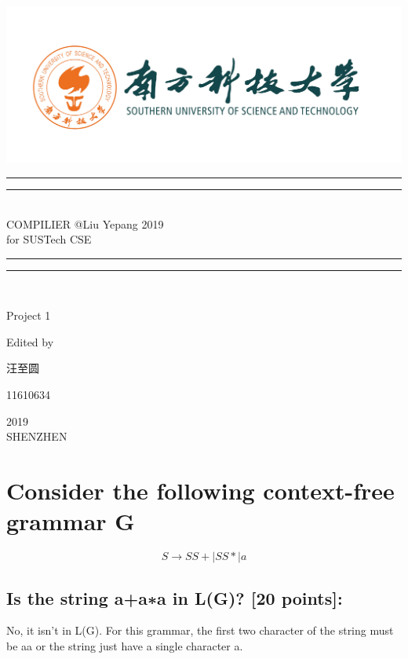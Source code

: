 \documentclass{article}
\begin{document}
 
    \begin{titlepage}       %
        \centering
        \includegraphics[width=\textwidth]{../SUSTC_LOGO.png}
        \rule{\textwidth}{1.6pt}\vspace*{-\baselineskip}\vspace*{2pt}
        \rule{\textwidth}{0.4pt}\\[\baselineskip]
        {\LARGE COMPILIER @Liu Yepang 2019\\[\baselineskip]\small for SUSTech CSE}
        \\[0.2\baselineskip]
        \rule{\textwidth}{0.4pt}\vspace*{-\baselineskip}\vspace{3.2pt}
        \rule{\textwidth}{1.6pt}\\[\baselineskip]
        \scshape
        \vspace*{\baselineskip}
        {\Large Project 1\par }
        Edited by \\[\baselineskip] {汪至圆\par}
        {\Large 11610634\par }
        \vfill
        {\scshape 2019} \\{\large SHENZHEN}\par
    \end{titlepage}
    \section{Consider the following context-free grammar G}
        $$S \rightarrow S S+|S S *| a$$
        \subsection{Is the string a+a∗a in L(G)? [20 points]:}
            No, it isn't in L(G). For this grammar, the first two character of the string
            must be aa or the string just have a single character a.
\end{document}
